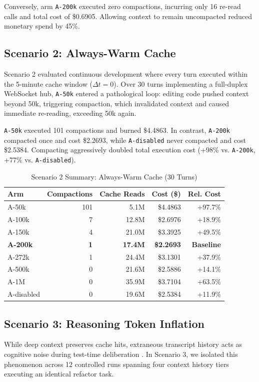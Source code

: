 \documentclass[10pt,twocolumn,a4paper]{article}
\begin{document}
Conversely, arm \texttt{A-200k} executed zero compactions, incurring only 16 re-read calls and total cost of \$0.6905. Allowing context to remain uncompacted reduced monetary spend by 45\%.

\subsection{Scenario 2: Always-Warm Cache}
Scenario 2 evaluated continuous development where every turn executed within the 5-minute cache window ($\Delta t = 0$). Over 30 turns implementing a full-duplex WebSocket hub, \texttt{A-50k} entered a pathological loop: editing code pushed context beyond 50k, triggering compaction, which invalidated context and caused immediate re-reading, exceeding 50k again.

\texttt{A-50k} executed 101 compactions and burned \$4.4863. In contrast, \texttt{A-200k} compacted once and cost \$2.2693, while \texttt{A-disabled} never compacted and cost \$2.5384. Compacting aggressively doubled total execution cost (+98\% vs. \texttt{A-200k}, +77\% vs. \texttt{A-disabled}).

\begin{table}[t]
\caption{Scenario 2 Summary: Always-Warm Cache (30 Turns)}
\label{tab:scenario2}
\centering
\small
\begin{tabular*}{\linewidth}{@{\extracolsep{\fill}}lrrrr@{}}
\toprule
\textbf{Arm} & \textbf{Compactions} & \textbf{Cache Reads} & \textbf{Cost (\$)} & \textbf{Rel. Cost} \\
\midrule
A-50k & 101 & 5.1M & \$4.4863 & +97.7\% \\
A-100k & 7 & 12.8M & \$2.6976 & +18.9\% \\
A-150k & 4 & 21.0M & \$3.3925 & +49.5\% \\
\textbf{A-200k} & \textbf{1} & \textbf{17.4M} & \textbf{\$2.2693} & \textbf{Baseline} \\
A-272k & 1 & 24.4M & \$3.1301 & +37.9\% \\
A-500k & 0 & 21.6M & \$2.5886 & +14.1\% \\
A-1M & 0 & 35.9M & \$3.7104 & +63.5\% \\
A-disabled & 0 & 19.6M & \$2.5384 & +11.9\% \\
\bottomrule
\end{tabular*}
\end{table}

\subsection{Scenario 3: Reasoning Token Inflation}
While deep context preserves cache hits, extraneous transcript history acts as cognitive noise during test-time deliberation \cite{snell2024scaling,liu2024lost}. In Scenario 3, we isolated this phenomenon across 12 controlled runs spanning four context history tiers executing an identical refactor task.
\end{document}
